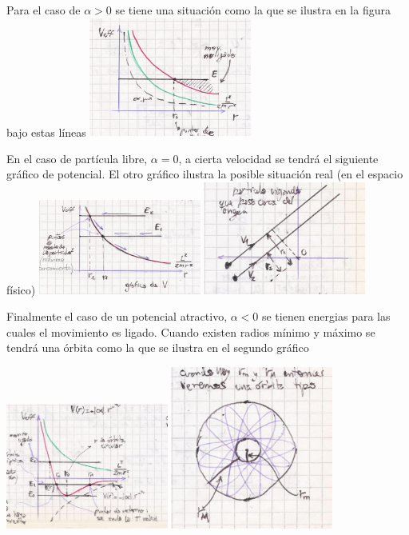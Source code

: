 \documentclass[10pt,oneside]{CBFT_book}
\begin{document}
Para el caso de $\alpha > 0$ se tiene una situación como la que se ilustra en la figura bajo estas líneas
\includegraphics[width=0.4\textwidth]{images/fig_mc_potencialcentral1.jpg}

En el caso de partícula libre, $\alpha=0$, a cierta velocidad se tendrá el siguiente gráfico de potencial. El otro 
gráfico ilustra la posible situación real (en el espacio físico)
\includegraphics[width=0.4\textwidth]{images/fig_mc_potencialcentral2.jpg}
\includegraphics[width=0.4\textwidth]{images/fig_mc_potencialcentral3.jpg}

Finalmente el caso de un potencial atractivo, $\alpha < 0 $ se tienen energias para las cuales el movimiento es ligado.
Cuando existen radios mínimo y máximo se tendrá una órbita como la que se ilustra en el segundo gráfico

\includegraphics[width=0.4\textwidth]{images/fig_mc_potencialcentral4.jpg}
\includegraphics[width=0.4\textwidth]{images/fig_mc_potencialcentral5.jpg}
\end{document}
